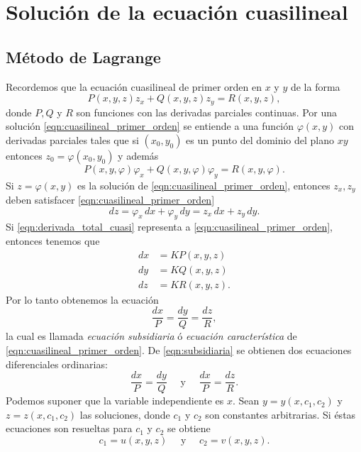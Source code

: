 \documentclass[11pt,letterpaper,draft]{report}
\theoremstyle{plain}
\theoremstyle{definition}
\theoremstyle{remark}
\newcommand\<{\langle}
\renewcommand\>{\rangle}
\renewcommand\phi\varphi
\begin{document}
\section{Solución de la ecuación cuasilineal}

\subsection{Método de Lagrange}

Recordemos que la ecuación cuasilineal de primer orden en
$x$ y $y$ de la forma
\begin{equation}
  \label{eqn:cuasilineal_primer_orden}
  P(x,y,z) z_x + Q(x,y,z) z_y = R(x,y,z),
\end{equation}
donde $P, Q$ y $R$ son funciones con las derivadas parciales
continuas. Por una solución
\ref{eqn:cuasilineal_primer_orden} se entiende a una función
$\phi(x,y)$ con derivadas parciales tales que si $(x_0,y_0)$
es un punto del dominio del plano $xy$ entonces $z_0 =
\phi(x_0,y_0)$ y además
\[
P(x,y,\phi) \phi_x + Q(x,y,\phi) \phi_y = R(x,y,\phi).
\] 
Si $z = \phi(x,y)$ es la solución de
\ref{eqn:cuasilineal_primer_orden}, entonces $z_x, z_y$
deben satisfacer \ref{eqn:cuasilineal_primer_orden}
\begin{equation}
  \label{eqn:derivada_total_cuasi}
  dz = \phi_x \, dx + \phi_y \, dy = z_x \, dx + z_y \, dy.
\end{equation}
Si \ref{eqn:derivada_total_cuasi} representa a
\ref{eqn:cuasilineal_primer_orden}, entonces tenemos que
\begin{align*}
  dx &= KP(x,y,z)\\
  dy &= KQ(x,y,z)\\
  dz &= KR(x,y,z).
\end{align*}
Por lo tanto obtenemos la ecuación
\begin{equation}
  \label{eqn:subsidiaria}
  \frac{dx}{P} = \frac{dy}{Q} = \frac{dz}{R},
\end{equation}
la cual es llamada \textit{ecuación subsidiaria} ó
\textit{ecuación característica} de
\ref{eqn:cuasilineal_primer_orden}. De \ref{eqn:subsidiaria}
se obtienen dos ecuaciones diferenciales ordinarias:
\[
\frac{dx}{P} = \frac{dy}{Q} \quad \text{ y } \quad
\frac{dx}{P} = \frac{dz}{R}.
\] 
Podemos suponer que la variable independiente es $x$. Sean
$y = y(x,c_1,c_2)$ y
$z = z(x,c_1,c_2)$ las soluciones, donde
$c_1$ y $c_2$ son constantes arbitrarias. Si éstas
ecuaciones son resueltas para $c_1$ y $c_2$ se obtiene
\[
c_1 = u(x,y,z) \quad \text{ y } \quad c_2 = v(x,y,z).
\] 
\end{document}
